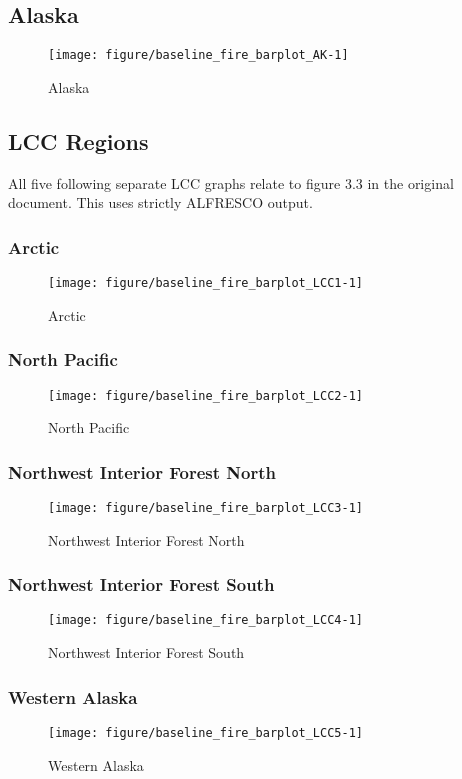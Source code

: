 \documentclass{article}\usepackage[]{graphicx}\usepackage[]{color}
\makeatletter
\def\maxwidth{ %
  \ifdim\Gin@nat@width>\linewidth
    \linewidth
  \else
    \Gin@nat@width
  \fi
}
\makeatother
\begin{document}
\subsection{Alaska}
\begin{figure}[H]
\texttt{[image: figure/baseline\_fire\_barplot\_AK-1]} \caption[Alaska]{Alaska}\label{fig:baseline_fire_barplot_AK}
\end{figure}



\newpage
\subsection{LCC Regions}
All five following separate LCC graphs relate to figure 3.3 in the original document.
This uses strictly ALFRESCO output.

\subsubsection{Arctic}
\begin{figure}[H]
\texttt{[image: figure/baseline\_fire\_barplot\_LCC1-1]} \caption[Arctic]{Arctic}\label{fig:baseline_fire_barplot_LCC1}
\end{figure}



\subsubsection{North Pacific}
\begin{figure}[H]
\texttt{[image: figure/baseline\_fire\_barplot\_LCC2-1]} \caption[North Pacific]{North Pacific}\label{fig:baseline_fire_barplot_LCC2}
\end{figure}



\subsubsection{Northwest Interior Forest North}
\begin{figure}[H]
\texttt{[image: figure/baseline\_fire\_barplot\_LCC3-1]} \caption[Northwest Interior Forest North]{Northwest Interior Forest North}\label{fig:baseline_fire_barplot_LCC3}
\end{figure}



\subsubsection{Northwest Interior Forest South}
\begin{figure}[H]
\texttt{[image: figure/baseline\_fire\_barplot\_LCC4-1]} \caption[Northwest Interior Forest South]{Northwest Interior Forest South}\label{fig:baseline_fire_barplot_LCC4}
\end{figure}



\subsubsection{Western Alaska}
\begin{figure}[H]
\texttt{[image: figure/baseline\_fire\_barplot\_LCC5-1]} \caption[Western Alaska]{Western Alaska}\label{fig:baseline_fire_barplot_LCC5}
\end{figure}
\end{document}
